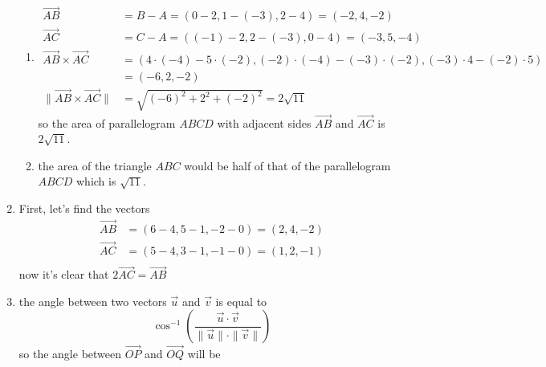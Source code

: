 \documentclass{article}
\begin{document}
\begin{enumerate}
{            \begin{enumerate}
                \item {
                    \begin{displaymath}
                        \begin{aligned}
                            \vec{AB} &= B - A = (0 - 2, 1 - (-3), 2 - 4) = (-2, 4, -2) \\
                            \vec{AC} &= C - A = ((-1) - 2, 2 - (-3), 0 - 4) = (-3, 5, -4) \\
                            \vec{AB}\times\vec{AC} &= (4\cdot(-4)-5\cdot(-2), (-2)\cdot(-4)-(-3)\cdot(-2), (-3)\cdot4-(-2)\cdot5) \\
                            &= (-6, 2, -2) \\
                            \|\vec{AB}\times\vec{AC}\| &= \sqrt{(-6)^2+2^2+(-2)^2} = 2\sqrt{11}
                        \end{aligned}
                    \end{displaymath}
                    so the area of parallelogram \(ABCD\) with adjacent sides \(\vec{AB}\) and \(\vec{AC}\) is \(2\sqrt{11}\).
                }
                \item {
                    the area of the triangle \(ABC\) would be half of that of the parallelogram \(ABCD\) which is \(\sqrt{11}\).
                }
            \end{enumerate}
        }
        \item { First, let's find the vectors
            \begin{displaymath}
                \begin{aligned}
                    \vec{AB} &= (6-4, 5-1, -2-0) = (2, 4, -2)\\
                    \vec{AC} &= (5-4, 3-1, -1-0) = (1, 2, -1)\\
                \end{aligned}
            \end{displaymath}
            now it's clear that \(2\vec{AC} = \vec{AB}\)
        }
        \item {
            the angle between two vectors \(\vec{u}\) and \(\vec{v}\) is equal to 
            \begin{displaymath}
                \cos^{-1}\left(\frac{\vec{u}\cdot\vec{v}}{\|\vec{u}\|\cdot\|\vec{v}\|}\right)
            \end{displaymath}
            so the angle between \(\vec{OP}\) and \(\vec{OQ}\) will be
            \begin{displaymath}

\end{displaymath}}
\end{enumerate}
\end{document}
